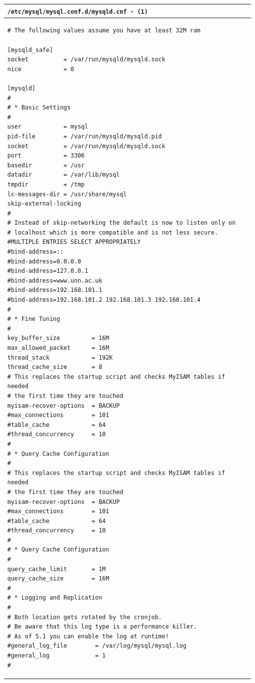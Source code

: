 \documentclass[11pt]{article}
\begin{document}
\begin{table}[ht]
    \begin{tabular}{|p{17.7cm}|} 
        \hline
        \texttt{\textbf{/etc/mysql/mysql.conf.d/mysqld.cnf} - \texttt{(1)}}\\ 
        \hline
        \lstset{
                basicstyle=\scriptsize\ttfamily,
              }
              \begin{lstlisting}
# The following values assume you have at least 32M ram

[mysqld_safe]
socket          = /var/run/mysqld/mysqld.sock
nice            = 0

[mysqld]
#
# * Basic Settings
#
user            = mysql
pid-file        = /var/run/mysqld/mysqld.pid
socket          = /var/run/mysqld/mysqld.sock
port            = 3306
basedir         = /usr
datadir         = /var/lib/mysql
tmpdir          = /tmp
lc-messages-dir = /usr/share/mysql
skip-external-locking
#
# Instead of skip-networking the default is now to listen only on
# localhost which is more compatible and is not less secure.
#MULTIPLE ENTRIES SELECT APPROPRIATELY
#bind-address=::
#bind-address=0.0.0.0
#bind-address=127.0.0.1
#bind-address=www.unn.ac.uk
#bind-address=192.168.101.1
#bind-address=192.168.101.2 192.168.101.3 192.168.101.4
#
# * Fine Tuning
#
key_buffer_size         = 16M
max_allowed_packet      = 16M
thread_stack            = 192K
thread_cache_size       = 8
# This replaces the startup script and checks MyISAM tables if needed
# the first time they are touched
myisam-recover-options  = BACKUP
#max_connections        = 101
#table_cache            = 64
#thread_concurrency     = 10
#
# * Query Cache Configuration
#
# This replaces the startup script and checks MyISAM tables if needed
# the first time they are touched
myisam-recover-options  = BACKUP
#max_connections        = 101
#table_cache            = 64
#thread_concurrency     = 10
#
# * Query Cache Configuration
#
query_cache_limit       = 1M
query_cache_size        = 16M
#
# * Logging and Replication
#
# Both location gets rotated by the cronjob.
# Be aware that this log type is a performance killer.
# As of 5.1 you can enable the log at runtime!
#general_log_file        = /var/log/mysql/mysql.log
#general_log             = 1
#                               
        \end{lstlisting}\\
        \hline
    \end{tabular}
\end{table}
\end{document}
